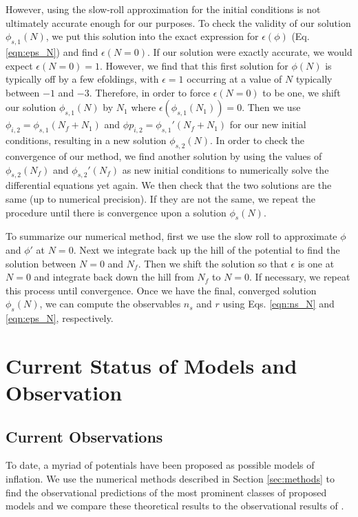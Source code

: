 \documentclass[a4paper,11pt]{article}
\begin{document}
However, using the slow-roll approximation for the initial conditions is not ultimately accurate enough for our purposes. To check the validity of our solution $\phi_{s,1}(N)$, we put this solution into the exact expression for $\epsilon(\phi)$ (Eq. \ref{eqn:eps_N}) and find $\epsilon(N=0)$. If our solution were exactly accurate, we would expect $\epsilon(N=0)=1$. However, we find that this first solution for $\phi(N)$ is typically off by a few efoldings, with $\epsilon=1$ occurring at a value of $N$ typically between $-1$ and $-3$. Therefore, in order to force $\epsilon(N=0)$ to be one, we shift our solution $\phi_{s,1}(N)$ by $N_1$ where $\epsilon(\phi_{s,1}(N_1))=0$. Then we use $\phi_{i,2} = \phi_{s,1}(N_f+N_1)$ and $\phi p_{i,2} = \phi_{s,1}'(N_f+N_1)$ for our new initial conditions, resulting in a new solution $\phi_{s,2}(N)$. In order to check the convergence of our method, we find another solution by using the values of $\phi_{s,2}(N_f)$ and $\phi_{s,2}'(N_f)$ as new initial conditions to numerically solve the differential equations yet again. We then check that the two solutions are the same (up to numerical precision). If they are not the same, we repeat the procedure until there is convergence upon a solution $\phi_s(N)$.

To summarize our numerical method, first we use the slow roll to approximate $\phi$ and $\phi'$ at $N=0$.  Next we integrate back up the hill of the potential to find the solution between $N=0$ and $N_f$. Then we shift the solution so that $\epsilon$ is one at $N=0$ and integrate back down the hill from $N_f$ to $N=0$. If necessary, we repeat this process until convergence. Once we have the final, converged solution $\phi_s(N)$, we can compute the observables $n_s$ and $r$ using Eqs. \ref{eqn:ns_N} and \ref{eqn:eps_N}, respectively.



\newpage
\section{Current Status of Models and Observation}
\label{sec:Planck}

\subsection{Current Observations}
To date, a myriad of potentials have been proposed as possible models of inflation. We use the numerical methods described in Section \ref{sec:methods} to find the observational predictions of the most prominent classes of proposed models and we compare these theoretical results to the observational results of \citet{Planck2015}. 
\end{document}
